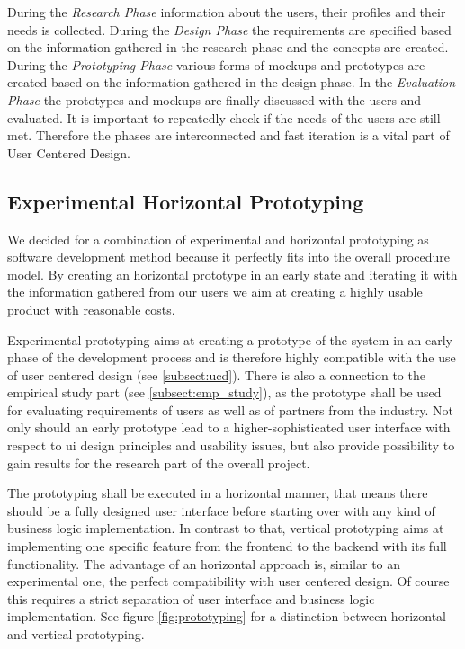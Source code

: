 \documentclass[a4paper,11pt]{article}
\begin{document}
During the \emph{Research Phase} information about the users, their profiles and their needs is collected. During the \emph{Design Phase} the requirements are specified based on the information gathered in the research phase and the concepts are created. During the \emph{Prototyping Phase} various forms of mockups and prototypes are created based on the information gathered in the design phase. In the \emph{Evaluation Phase} the prototypes and mockups are finally discussed with the users and evaluated. It is important to repeatedly check if the needs of the users are still met. Therefore the phases are interconnected and fast iteration is a vital part of User Centered Design.

\subsection{Experimental Horizontal Prototyping}
We decided for a combination of experimental and horizontal prototyping as software development method because it perfectly fits into the overall procedure model. By creating an horizontal prototype in an early state and iterating it with the information gathered from our users we aim at creating a highly usable product with reasonable costs.

Experimental prototyping aims at creating a prototype of the system in an early phase of the development process and is therefore highly compatible with the use of user centered design (see \ref{subsect:ucd}).
There is also a connection to the empirical study part (see \ref{subsect:emp_study}), as the prototype shall be used for evaluating requirements of users as well as of partners from the industry. Not only should an early prototype lead to a higher-sophisticated user interface with respect to ui design principles and usability issues, but also provide possibility to gain results for the research part of the overall project. 

The prototyping shall be executed in a horizontal manner, that means there should be a fully designed user interface before starting over with any kind of business logic implementation. In contrast to that, vertical prototyping aims at implementing one specific feature from the frontend to the backend with its full functionality. The advantage of an horizontal approach is, similar to an experimental one, the perfect compatibility with user centered design. Of course this requires a strict separation of user interface and business logic implementation. See figure \ref{fig:prototyping} for a distinction between horizontal and vertical prototyping.
\end{document}
